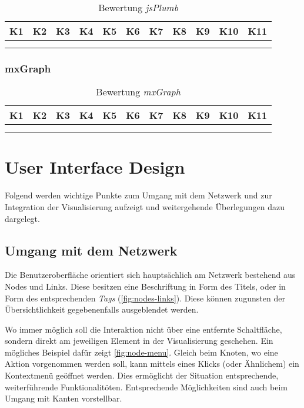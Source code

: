 
\begin{longtable}{|p{0.5cm}|p{0.5cm}|p{0.5cm}|p{0.5cm}|p{0.5cm}|p{0.5cm}|p{0.5cm}|p{0.5cm}|p{0.5cm}|p{0.7cm}|p{0.7cm}|}
  \hline
    K1 & K2 & K3 & K4 & K5 & K6 & K7 & K8 & K9 & K10 & K11 \\\hline
    & & & & & & & & & &\\\hline
    \caption{Bewertung \textit{jsPlumb}}
  \label{tab:bewertung-jsplumb}
\end{longtable}


\subsubsection{mxGraph}

\begin{longtable}{|p{0.5cm}|p{0.5cm}|p{0.5cm}|p{0.5cm}|p{0.5cm}|p{0.5cm}|p{0.5cm}|p{0.5cm}|p{0.5cm}|p{0.7cm}|p{0.7cm}|}
  \hline
    K1 & K2 & K3 & K4 & K5 & K6 & K7 & K8 & K9 & K10 & K11 \\\hline
    & & & & & & & & & &\\\hline
    \caption{Bewertung \textit{mxGraph}}
  \label{tab:bewertung-mxgraph}
\end{longtable}

 
\section{User Interface Design}

Folgend werden wichtige Punkte zum Umgang mit dem Netzwerk und zur Integration der Visualisierung aufzeigt und weitergehende Überlegungen dazu dargelegt.

\subsection{Umgang mit dem Netzwerk}

Die Benutzeroberfläche orientiert sich hauptsächlich am Netzwerk bestehend aus Nodes und Links. Diese besitzen eine Beschriftung in Form des Titels, oder in Form des entsprechenden \textit{Tags} (\autoref{fig:nodes-links}). Diese können zugunsten der Übersichtlichkeit gegebenenfalls ausgeblendet werden.

Wo immer möglich soll die Interaktion nicht über eine entfernte Schaltfläche, sondern direkt am jeweiligen Element in der Visualisierung geschehen. Ein mögliches Beispiel dafür zeigt \autoref{fig:node-menu}. Gleich beim Knoten, wo eine Aktion vorgenommen werden soll, kann mittels eines Klicks (oder Ähnlichem) ein Kontextmenü geöffnet werden. Dies ermöglicht der Situation entsprechende, weiterführende Funktionalitöten. Entsprechende Möglichkeiten sind auch beim Umgang mit Kanten vorstellbar.

